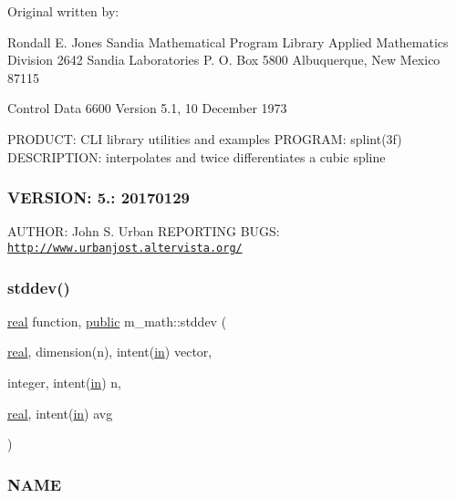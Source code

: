 \begin{DoxyVerb}Original written by:

  Rondall E. Jones
  Sandia Mathematical Program Library
  Applied Mathematics Division 2642
  Sandia Laboratories
  P. O. Box 5800
  Albuquerque, New Mexico  87115

Control Data 6600 Version 5.1, 10 December 1973 \end{DoxyVerb}


P\+R\+O\+D\+U\+CT\+: C\+LI library utilities and examples P\+R\+O\+G\+R\+AM\+: splint(3f) D\+E\+S\+C\+R\+I\+P\+T\+I\+ON\+: interpolates and twice differentiates a cubic spline \subsubsection*{V\+E\+R\+S\+I\+ON\+: 5.\+: 20170129}

A\+U\+T\+H\+OR\+: John S. Urban R\+E\+P\+O\+R\+T\+I\+NG B\+U\+GS\+: \href{http://www.urbanjost.altervista.org/}{\tt http\+://www.\+urbanjost.\+altervista.\+org/} \mbox{\label{namespacem__math_af6b04705727dc68a6e2eeff3a0e71cf1}} 
\subsubsection{\texorpdfstring{stddev()}{stddev()}}
{\footnotesize\ttfamily \hyperlink{read__watch_83_8txt_abdb62bde002f38ef75f810d3a905a823}{real} function, \hyperlink{M__stopwatch_83_8txt_a2f74811300c361e53b430611a7d1769f}{public} m\+\_\+math\+::stddev (\begin{DoxyParamCaption}\item[{\hyperlink{read__watch_83_8txt_abdb62bde002f38ef75f810d3a905a823}{real}, dimension(n), intent(\hyperlink{M__journal_83_8txt_afce72651d1eed785a2132bee863b2f38}{in})}]{vector,  }\item[{integer, intent(\hyperlink{M__journal_83_8txt_afce72651d1eed785a2132bee863b2f38}{in})}]{n,  }\item[{\hyperlink{read__watch_83_8txt_abdb62bde002f38ef75f810d3a905a823}{real}, intent(\hyperlink{M__journal_83_8txt_afce72651d1eed785a2132bee863b2f38}{in})}]{avg }\end{DoxyParamCaption})}



\subsubsection*{N\+A\+ME}

